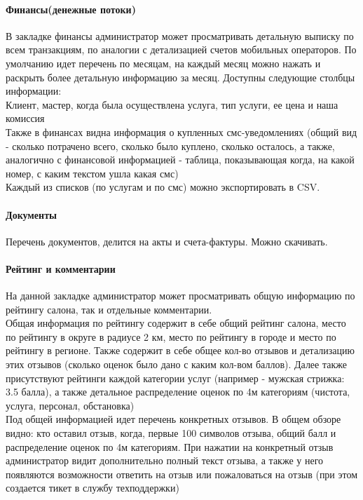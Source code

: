 \documentclass[DIV=calc, paper=a4, fontsize=11pt]{scrartcl} %
\begin{document}
\paragraph{Финансы(денежные потоки)}
В закладке финансы администратор может просматривать детальную выписку по всем транзакциям, по аналогии с детализацией счетов мобильных операторов. По умолчанию идет перечень по месяцам, на каждый месяц можно нажать и раскрыть более детальную информацию за месяц. Доступны следующие столбцы информации:
\\[0.5cm] Клиент, мастер, когда была осуществлена услуга, тип услуги, ее цена и наша комиссия
\\[0.5cm] Также в финансах видна информация о купленных смс-уведомлениях (общий вид - сколько потрачено всего, сколько было куплено, сколько осталось, а также, аналогично с финансовой информацией - таблица, показывающая когда, на какой номер, с каким текстом ушла какая смс)
\\[0.5cm] Каждый из списков (по услугам и по смс) можно экспортировать в CSV.

\paragraph{Документы}
Перечень документов, делится на акты и счета-фактуры. Можно скачивать.

\paragraph{Рейтинг и комментарии}
На данной закладке администратор может просматривать общую информацию по рейтингу салона, так и отдельные комментарии. 
\\[0.5cm]Общая информация по рейтингу содержит в себе общий рейтинг салона, место по рейтингу в округе в радиусе 2 км, место по рейтингу в городе и место по рейтингу в регионе. Также содержит в себе общее кол-во отзывов и детализацию этих отзывов (сколько оценок было дано с каким кол-вом баллов). Далее также присутствуют рейтинги каждой категории услуг (например - мужская стрижка: 3.5 балла), а также детальное распределение оценок по 4м категориям (чистота, услуга, персонал, обстановка)
\\[0.5cm]Под общей информацией идет перечень конкретных отзывов. В общем обзоре видно: кто оставил отзыв, когда, первые 100 символов отзыва, общий балл и распределение оценок по 4м категориям. При нажатии на конкретный отзыв администратор видит дополнительно полный текст отзыва, а также у него появляются возможности ответить на отзыв или пожаловаться на отзыв (при этом создается тикет в службу техподдержки)
\end{document}
